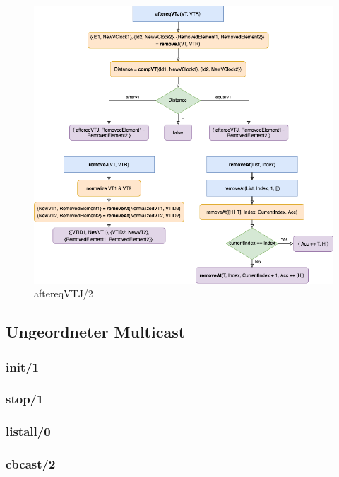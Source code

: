 \begin{figure}[htbp]
\begin{center}
\includegraphics[scale=0.55]{Latex/Bilder/aftereqVTJ_realisierung.png}
\caption{\label{fig:flow_aftereqvtj_realisierung} aftereqVTJ/2}
\end{center}
\end{figure}

\subsection{Ungeordneter Multicast}

\subsubsection{init/1}

\subsubsection{stop/1}

\subsubsection{listall/0}

\subsubsection{cbcast/2}

